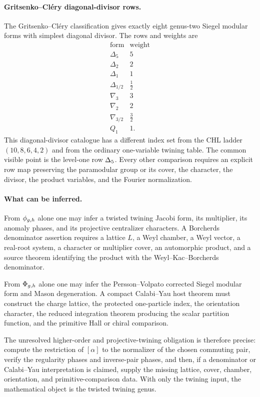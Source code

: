 \paragraph{Gritsenko--Cl\'ery diagonal-divisor rows.}
The Gritsenko--Cl\'ery classification gives exactly eight genus-two
Siegel modular forms with simplest diagonal divisor.  The rows and
weights are
\[
\begin{array}{c|c}
\text{form}&\text{weight}\\ \hline
\Delta_5&5\\
\Delta_2&2\\
\Delta_1&1\\
\Delta_{1/2}&\tfrac12\\
\nabla_3&3\\
\nabla_2&2\\
\nabla_{3/2}&\tfrac32\\
Q_1&1 .
\end{array}
\]
This diagonal-divisor catalogue has a different index set from the CHL
ladder \((10,8,6,4,2)\) and from the ordinary one-variable twining
table.  The common visible point is the level-one row \(\Delta_5\).
Every other comparison requires an explicit row map preserving the
paramodular group or its cover, the character, the divisor, the product
variables, and the Fourier normalization.

\paragraph{What can be inferred.}
From \(\phi_{g,h}\) alone one may infer a twisted twining Jacobi form, its
multiplier, its anomaly phases, and its projective centralizer
characters.  A Borcherds denominator assertion requires a lattice
\(L\), a Weyl chamber, a Weyl vector, a real-root system, a character
or multiplier cover, an automorphic product, and a source theorem
identifying the product with the Weyl--Kac--Borcherds denominator.

From \(\Phi_{g,h}\) alone one may infer the Persson--Volpato corrected
Siegel modular form and Mason degeneration.  A compact Calabi--Yau host
theorem must construct the charge lattice, the protected one-particle
index, the orientation character, the reduced integration theorem
producing the scalar partition function, and the primitive Hall or
chiral comparison.

The unresolved higher-order and projective-twining obligation is
therefore precise: compute the restriction of \([\alpha]\) to the
normalizer of the chosen commuting pair, verify the regularity phases
and inverse-pair phases, and then, if a denominator or Calabi--Yau
interpretation is claimed, supply the missing lattice, cover, chamber,
orientation, and primitive-comparison data.  With only the twining
input, the mathematical object is the twisted twining genus.
